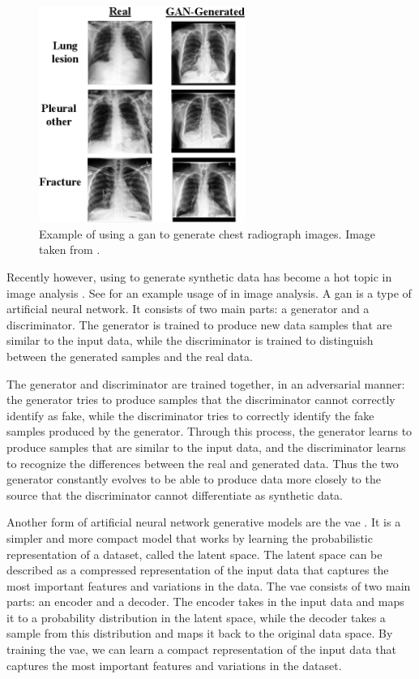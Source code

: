 \documentclass[12pt, letterpaper]{article}
\begin{document}
\begin{figure}[t]
    \centering
    \includegraphics[width=0.6\textwidth]{figures/gan-xray.png}
    \caption{Example of using a \acrfull{gan} to generate chest radiograph images. Image taken from \cite{sundaram_gan-based_2021}.}
    \label{fig:gan-xray}
\end{figure}

Recently however, using  to generate synthetic data has become a hot topic in image analysis \cite{pavan_kumar_generative_2021}. See  for an example usage of  in image analysis. A \acrshort{gan} is a type of artificial neural network. It consists of two main parts: a generator and a discriminator. The generator is trained to produce new data samples that are similar to the input data, while the discriminator is trained to distinguish between the generated samples and the real data.

The generator and discriminator are trained together, in an adversarial manner: the generator tries to produce samples that the discriminator cannot correctly identify as fake, while the discriminator tries to correctly identify the fake samples produced by the generator. Through this process, the generator learns to produce samples that are similar to the input data, and the discriminator learns to recognize the differences between the real and generated data. Thus the two generator constantly evolves to be able to produce data more closely to the source that the discriminator cannot differentiate as synthetic data.

Another form of artificial neural network generative models are the \acrfull{vae} \cite{kingma_auto-encoding_2013}. It is a simpler and more compact model that works by learning the probabilistic representation of a dataset, called the latent space. The latent space can be described as a compressed representation of the input data that captures the most important features and variations in the data. The \acrshort{vae} consists of two main parts: an encoder and a decoder. The encoder takes in the input data and maps it to a probability distribution in the latent space, while the decoder takes a sample from this distribution and maps it back to the original data space. By training the \acrshort{vae}, we can learn a compact representation of the input data that captures the most important features and variations in the dataset.
\end{document}
